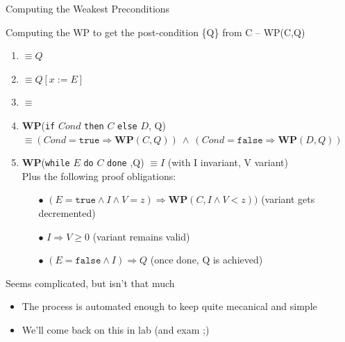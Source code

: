 \begin{frame}{Computing the Weakest Preconditions}
  \begin{block}{Computing the WP to get the post-condition \{Q\}
      from C -- WP(C,Q)}
    \begin{enumerate}
\item {}  $\equiv Q$
\item {} $\equiv Q[x:=E]$
\item {}  $\equiv$ 
\item \textbf{WP}(\texttt{if} $Cond$ \texttt{then} $C$ \texttt{else} $D$, Q)
  $\equiv (Cond=\mathtt{true}\Rightarrow \mathbf{WP}(C,Q))~\wedge~
          (Cond=\mathtt{false}\Rightarrow \mathbf{WP}(D,Q))$
\item \textbf{WP}(\texttt{while} $E$ \texttt{do} $C$ \texttt{done} ,Q) %
  $\equiv I$ \hfill (with I invariant, V variant)\\
  Plus the following proof obligations:
  \begin{itemize}
  \item[$\bullet$] $(E=\mathtt{true}\wedge I\wedge V=z) \Rightarrow
    \mathbf{WP}(C,I\wedge V<z))$
    \hfill(variant gets decremented)
  \item[$\bullet$] $I\Rightarrow V\geq 0$
    \hfill (variant remains valid)
  \item[$\bullet$] $(E=\mathtt{false}\wedge I) \Rightarrow Q$
    \hfill (once done, Q is achieved)
  \end{itemize}
\end{enumerate}

  \end{block}

  \begin{block}{Seems complicated, but isn't that much}
    \begin{itemize}
    \item The process is automated enough to keep quite mecanical and simple
    \item We'll come back on this in lab (and exam ;)
    \end{itemize}
  \end{block}
\end{frame}
